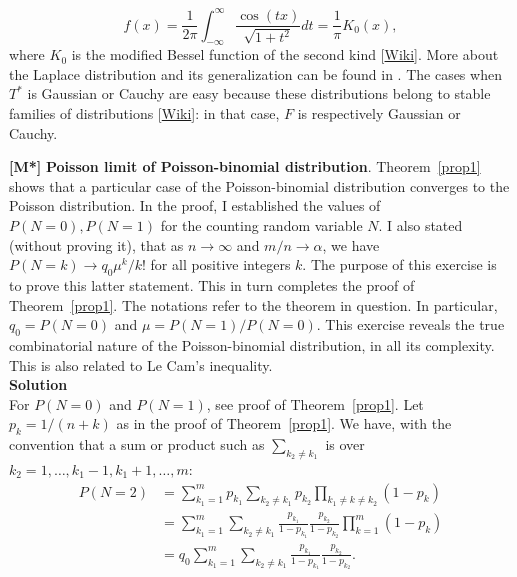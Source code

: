 \documentclass[10pt]{article}
\begin{document}
\begin{Exercise}
$$f(x)=\frac{1}{2\pi}\int_{-\infty}^\infty \frac{\cos(tx)}{\sqrt{1+t^2}} dt = \frac{1}{\pi}K_0(x),$$
where $K_0$ is the modified \textcolor{index}{Bessel function} of the second kind
[\href{https://mathworld.wolfram.com/ModifiedBesselFunctionoftheSecondKind.html}{Wiki}].
More about the Laplace distribution and its generalization can be found in \cite{laplace}. The cases when $T^*$ is Gaussian or Cauchy are easy because these distributions belong to \textcolor{index}{stable families of distributions}
[\href{https://en.wikipedia.org/wiki/Stable_distribution}{Wiki}]:
in that case, $F$ is respectively Gaussian or Cauchy.
\end{Exercise}

\begin{Exercise}\label{exercise14}{\bf [M*]}
{\bf Poisson limit of Poisson-binomial distribution}.  Theorem~\ref{prop1} shows that a particular case of the Poisson-binomial distribution converges to the Poisson distribution. In the proof, I established the values of $P(N=0), P(N=1)$ for the counting random variable $N$. I also stated (without proving it), that as $n\rightarrow\infty$ and $m/n\rightarrow\alpha$, we have $P(N=k)\rightarrow q_0\mu^k/k!$ for all positive integers $k$.  The purpose of this exercise is to prove this latter statement.
This in turn completes the proof of Theorem~\ref{prop1}. The notations refer to the theorem in question.  In particular, $q_0=P(N=0)$ and $\mu=P(N=1)/P(N=0)$.
This exercise reveals  the true combinatorial nature of the Poisson-binomial distribution, in all its complexity. This is also related to \textcolor{index}{Le Cam's inequality}. \vspace{1ex}   \\
{\bf Solution} \vspace{1ex}   \\
For $P(N=0)$ and $P(N=1)$, see proof of Theorem~\ref{prop1}. Let $p_k=1/(n+k)$ as in the proof of Theorem~\ref{prop1}. We have, with the convention that a sum or product such as
$\sum_{k_2\neq k_1}$ is over $k_2=1,\dots,k_1-1,k_1+1,\dots,m$:
\begin{align}
P(N=2)& =\sum_{k_1=1}^m p_{k_1} \sum_{k_2\neq k_1} p_{k_2}\prod_{k_1 \neq k\neq k_2} (1-p_k) \nonumber \\
&= \sum_{k_1=1}^m \sum_{k_2\neq k_1} \frac{p_{k_1}}{1-p_{k_1}}\frac{p_{k_2}}{1-p_{k_2}}\prod_{k=1}^m (1-p_k)\nonumber \\
&= q_0 \sum_{k_1=1}^m \sum_{k_2\neq k_1} \frac{p_{k_1}}{1-p_{k_1}}\frac{p_{k_2}}{1-p_{k_2}}. \label{dds}

\end{align}
\end{Exercise}
\end{document}

